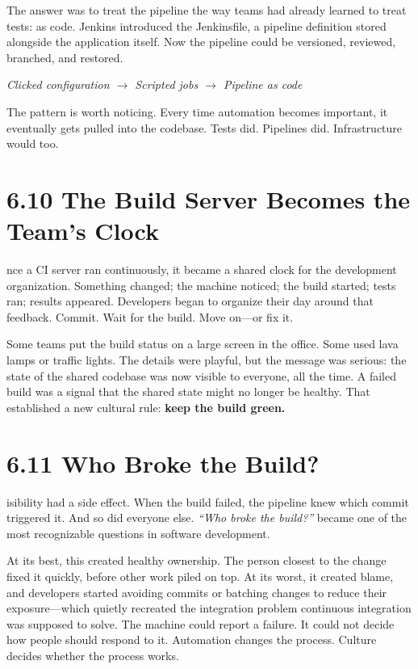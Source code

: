 \documentclass[11pt, a4paper, openany]{book}
\newcommand{\initialcap}[1]{{\fontfamily{lmss}\selectfont\huge\textbf{#1}}}
\begin{document}
\noindent The answer was to treat the pipeline the way teams had already learned to treat tests: as code. Jenkins introduced the Jenkinsfile, a pipeline definition stored alongside the application itself. Now the pipeline could be versioned, reviewed, branched, and restored.
\begin{center}
\textit{Clicked configuration $\rightarrow$ Scripted jobs $\rightarrow$ Pipeline as code}
\end{center}
The pattern is worth noticing. Every time automation becomes important, it eventually gets pulled into the codebase. Tests did. Pipelines did. Infrastructure would too.

\section{6.10 The Build Server Becomes the Team's Clock}
\noindent \initialcap{O}nce a CI server ran continuously, it became a shared clock for the development organization. Something changed; the machine noticed; the build started; tests ran; results appeared. Developers began to organize their day around that feedback. Commit. Wait for the build. Move on---or fix it.

\noindent Some teams put the build status on a large screen in the office. Some used lava lamps or traffic lights. The details were playful, but the message was serious: the state of the shared codebase was now visible to everyone, all the time. A failed build was a signal that the shared state might no longer be healthy. That established a new cultural rule: \textbf{keep the build green.}

\section{6.11 Who Broke the Build?}
\noindent \initialcap{V}isibility had a side effect. When the build failed, the pipeline knew which commit triggered it. And so did everyone else. \textit{``Who broke the build?''} became one of the most recognizable questions in software development.

\noindent At its best, this created healthy ownership. The person closest to the change fixed it quickly, before other work piled on top. At its worst, it created blame, and developers started avoiding commits or batching changes to reduce their exposure---which quietly recreated the integration problem continuous integration was supposed to solve. The machine could report a failure. It could not decide how people should respond to it. Automation changes the process. Culture decides whether the process works.
\end{document}
